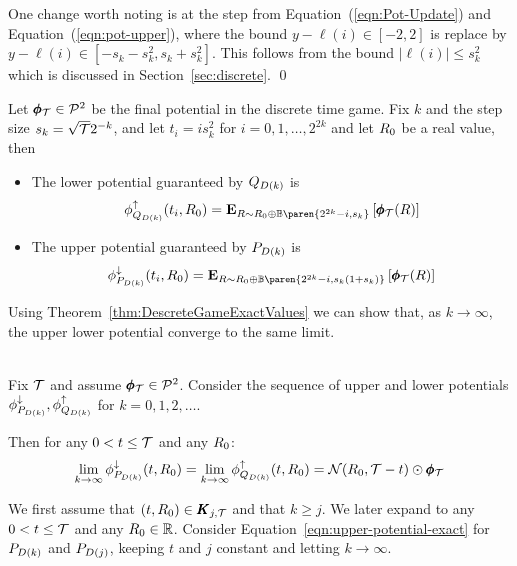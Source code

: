 \documentclass{article}[12pt]
\begin{document}
One change worth noting is at the step from
Equation~(\ref{eqn:Pot-Update}) and Equation~(\ref{eqn:pot-upper}),
where the bound  $y-\ell(i) \in [-2,2]$ is replace by  $y-\ell(i) \in
[-s_k-s_k^2,s_k+s_k^2]$. This follows from the bound $|\ell(i)| \leq
s_k^2$ which is discussed in Section~\ref{sec:discrete}.
\qed

\begin{theorem} \label{thm:DescreteGameExactValues}
  Let $\pmb{\phi}_{\mathcal{T}} \in {\cal P}^{2}$ be the final potential in the discrete
  time game. Fix $k$ and the step size $s_k=\sqrt{\mathcal{T}} 2^{-k}$, and let $t_i=i s_k^2$ for $i=0,1,\ldots,2^{2k}$ and
  let $R_0$ be a real value, then 
  \begin{itemize}
  \item
    The lower potential guaranteed by $Q_{D(k)}$ is
    \begin{equation} \label{eqn:lower-potential-exact}
      \lowerpotMdk(t_i,\R_0) = \E{\R \sim \R_0 \oplus
        \Binom\paren{2^{2k}-i,s_k}}{\finalPotR(\R)}
      \end{equation}
  \item
    The upper potential guaranteed by $P_{D(k)}$ is
    \begin{equation} \label{eqn:upper-potential-exact}
    \upperpotMdk(t_i,\R_0) =  \E{\R \sim \R_0 \oplus
      \Binom\paren{2^{2k}-i,s_k(1+s_k)}}{\finalPotR(\R)}
    \end{equation}
  \end{itemize}
\end{theorem}

Using Theorem~\ref{thm:DescreteGameExactValues} we can show that, as
$k \to \infty$, the upper lower potential converge to the same limit.

\begin{theorem} \label{thm:seq-of-adv-strategies}
  ~\\
  Fix $\mathcal{T}$ and assume $\pmb{\phi}_{\mathcal{T}} \in {\cal P}^{2}$. Consider the sequence of upper
  and lower potentials  $\phi_{P_{D(k)}}^{\downarrow},\phi_{Q_{D(k)}}^{\uparrow}$ for
  $k=0,1,2,\ldots$.

  Then for any  $0 < t \leq \mathcal{T}$ and any $R_0$:
  \begin{equation} \label{eqn:k-limit}
    \lim_{k \to \infty} \phi_{P_{D(k)}}^{\downarrow}(t,R_0) =
    \lim_{k \to \infty}\phi_{Q_{D(k)}}^{\uparrow}(t,R_0)=
    {\cal N}(R_0,\mathcal{T}-t) \odot \pmb{\phi}_{\mathcal{T}}
  \end{equation}
\end{theorem}

\proof

We first assume that $(t,R_0) \in \pmb{K}_{j,\mathcal{T}}$ and that $k\geq j$. We later expand to any $0 < t \leq \mathcal{T}$ and any $R_0 \in \mathbb{R}$.
Consider Equation~\ref{eqn:upper-potential-exact} for $P_{D(k)}$ and $P_{D(j)}$,
keeping $t$ and $j$ constant and letting $k \to \infty$.
\end{document}

